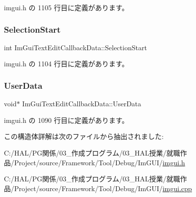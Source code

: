  imgui.\+h の 1105 行目に定義があります。

\mbox{\label{struct_im_gui_text_edit_callback_data_a1634bec3717f7e386033051cf604efed}} 
\subsubsection{\texorpdfstring{Selection\+Start}{SelectionStart}}
{\footnotesize\ttfamily int Im\+Gui\+Text\+Edit\+Callback\+Data\+::\+Selection\+Start}



 imgui.\+h の 1104 行目に定義があります。

\mbox{\label{struct_im_gui_text_edit_callback_data_aaf4994a17aefa6ace9cf8f7c2fa06cf7}} 
\subsubsection{\texorpdfstring{User\+Data}{UserData}}
{\footnotesize\ttfamily void$\ast$ Im\+Gui\+Text\+Edit\+Callback\+Data\+::\+User\+Data}



 imgui.\+h の 1090 行目に定義があります。



この構造体詳解は次のファイルから抽出されました\+:\begin{DoxyCompactItemize}
\item 
C\+:/\+H\+A\+L/\+P\+G関係/03\+\_\+作成プログラム/03\+\_\+\+H\+A\+L授業/就職作品/\+Project/source/\+Framework/\+Tool/\+Debug/\+Im\+G\+U\+I/\mbox{\hyperlink{imgui_8h}{imgui.\+h}}\item 
C\+:/\+H\+A\+L/\+P\+G関係/03\+\_\+作成プログラム/03\+\_\+\+H\+A\+L授業/就職作品/\+Project/source/\+Framework/\+Tool/\+Debug/\+Im\+G\+U\+I/\mbox{\hyperlink{imgui_8cpp}{imgui.\+cpp}}\end{DoxyCompactItemize}
